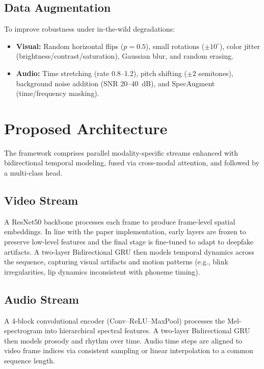 \subsection{Data Augmentation}
To improve robustness under in-the-wild degradations:
\begin{itemize}
    \item \textbf{Visual:} Random horizontal flips ($p=0.5$), small rotations ($\pm 10^\circ$), color jitter (brightness/contrast/saturation), Gaussian blur, and random erasing.
    \item \textbf{Audio:} Time stretching (rate 0.8–1.2), pitch shifting ($\pm 2$ semitones), background noise addition (SNR 20–40~dB), and SpecAugment (time/frequency masking). \cite{specaugment2019}
\end{itemize}

\section{Proposed Architecture}
The framework comprises parallel modality-specific streams enhanced with bidirectional temporal modeling, fused via cross-modal attention, and followed by a multi-class head.

\subsection{Video Stream}
A ResNet50 backbone processes each frame to produce frame-level spatial embeddings. In line with the paper implementation, early layers are frozen to preserve low-level features and the final stage is fine-tuned to adapt to deepfake artifacts. A two-layer Bidirectional GRU then models temporal dynamics across the sequence, capturing visual artifacts and motion patterns (e.g., blink irregularities, lip dynamics inconsistent with phoneme timing).

\subsection{Audio Stream}
A 4-block convolutional encoder (Conv–ReLU–MaxPool) processes the Mel-spectrogram into hierarchical spectral features. A two-layer Bidirectional GRU then models prosody and rhythm over time. Audio time steps are aligned to video frame indices via consistent sampling or linear interpolation to a common sequence length.

